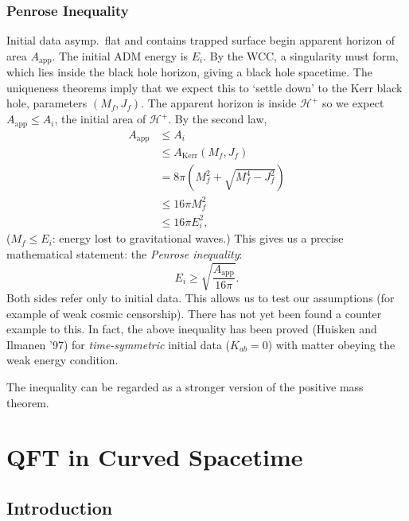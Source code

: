 \subsection{Penrose Inequality}%
\label{sub:penrose_inequality}

Initial data asymp.~flat and contains trapped surface begin apparent horizon of area $A_{\text{app}}$.
The initial ADM energy is $E_i$. By the WCC, a singularity must form, which lies inside the black hole horizon, giving a black hole spacetime.
The uniqueness theorems imply that we expect this to `settle down' to the Kerr black hole, parameters $(M_f, J_f)$.
The apparent horizon is inside $\mathcal{H}^+$ so we expect $A_{\text{app}} \leq A_i$, the initial area of $\mathcal{H}^+$.
By the second law,
\begin{align}
  A_{\text{app}} &\leq A_i \\
		 & \leq A_{\text{Kerr}}(M_f, J_f) \\
		 &= 8 \pi (M_f^2 + \sqrt{M_f^4 - J_f^2}) \\
		 & \leq 16 \pi M_f^2 \\
		 & \leq 16 \pi E_i^2,
\end{align}
($M_f \leq E_i$: energy lost to gravitational waves.)
This gives us a precise mathematical statement: the \emph{Penrose inequality}:
\begin{equation}
  E_i \geq \sqrt{\frac{A_{\text{app}}}{16 \pi}}.
\end{equation}
Both sides refer only to initial data. This allows us to test our assumptions (for example of weak cosmic censorship).  There has not yet been found a counter example to this.  In fact, the above inequality has been proved (Huisken and Ilmanen '97) for \emph{time-symmetric} initial data ($K_{ab} = 0$) with matter obeying the weak energy condition.
\begin{remark}
  The inequality can be regarded as a stronger version of the positive mass theorem.
\end{remark}

\chapter{QFT in Curved Spacetime}%
\label{cha:qft_in_curved_spacetime}

\section{Introduction}%
\label{sec:introduction}

